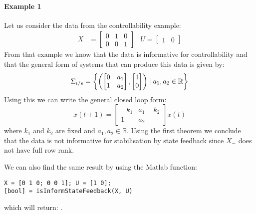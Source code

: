 \paragraph*{Example 1}
Let us consider the data from the controllability example:
\begin{align*}
X &= \begin{bmatrix} 0&1&0 \\ 0&0&1 \end{bmatrix} & U = \begin{bmatrix}	1&0	\end{bmatrix}
\end{align*} 
From that example we know that the data is informative for controllability and that the general form of systems that can produce this data is given by:
\[ \Sigma_{i/s} = \left\{ \left( \begin{bmatrix} 0&a_1 \\ 1&a_2 \end{bmatrix}, \begin{bmatrix} 1 \\ 0 \end{bmatrix} \right) \, | \, a_1, a_2 \in \mathbb{R} \right\} \]
Using this we can write the general closed loop form:
\[ x(t+1) = \begin{bmatrix}
-k_1 & a_1 - k_2 \\ 1 & a_2
\end{bmatrix} x(t) \]
where $k_1$ and $k_2$ are fixed and $a_1 , a_2 \in \mathbb{R}$. Using the first theorem we conclude that the data is not informative for stabilisation by state feedback since $X_-$ does not have full row rank. 

We can also find the same result by using the Matlab function:
\begin{lstlisting}
X = [0 1 0; 0 0 1]; U = [1 0];
[bool] = isInformStateFeedback(X, U)
\end{lstlisting}
which will return: \mon{[ 0 ]}.

